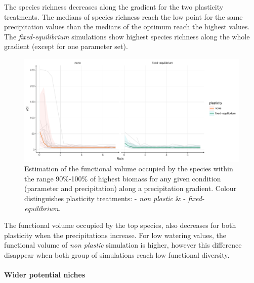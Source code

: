 The species richness decreases along the gradient for the two plasticity treatments. The medians of species richness reach the low point for the same precipitation values than the medians of the optimum reach the highest values. The \textit{fixed-equilibrium} simulations show highest species richness along the whole gradient (except for one parameter set).

\begin{figure}\label{fig:functional_div_grad}
\includegraphics[width = \textwidth]{./2_PP/Figures/Rain/gradient_plot_fdiv10.pdf}
\caption[Functional diversity of the best performing species along a precipitation gradient]{Estimation of the functional volume occupied by the species within the range 90\%-100\% of highest biomass for any given condition (parameter and precipitation) along a precipitation gradient.  Colour distinguishes plasticity treatments: \textcolor{myOrange}{- \textit{non plastic}} \&  \textcolor{myGreen}{- \textit{fixed-equilibrium}}.} \end{figure}

The functional volume occupied by the top species, also decreases for both plasticity when the precipitations increase. For low watering values, the functional volume of \textit{non plastic} simulation is higher, however this difference disappear when both group of simulations reach low functional diversity.

\paragraph{Wider potential niches}


